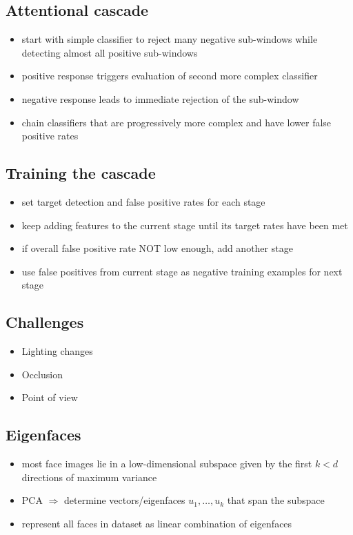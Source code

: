 \documentclass[12pt]{article}
\begin{document}
	\subsection{Attentional cascade}
	\begin{itemize}
		\item start with simple classifier to reject many negative sub-windows while detecting almost all positive sub-windows
		\item positive response triggers evaluation of second more complex classifier
		\item negative response leads to immediate rejection of the sub-window
		\item chain classifiers that are progressively more complex and have lower false positive rates
	\end{itemize}

	\subsection{Training the cascade}
	\begin{itemize}
		\item set target detection and false positive rates for each stage
		\item keep adding features to the current stage until its target rates have been met
		\item if overall false positive rate NOT low enough, add another stage
		\item use false positives from current stage as negative training examples for next stage
	\end{itemize}
	
	\subsection{Challenges}
	\begin{itemize}
		\item Lighting changes
		\item Occlusion
		\item Point of view
	\end{itemize}

	\subsection{Eigenfaces}
	\begin{itemize}
		\item most face images lie in a low-dimensional subspace given by the first $k<d$ directions of maximum variance
		\item PCA $\Rightarrow$ determine vectors/eigenfaces $u_1, \dots, u_k$ that span the subspace
		\item represent all faces in dataset as linear combination of eigenfaces
	\end{itemize}
\end{document}
